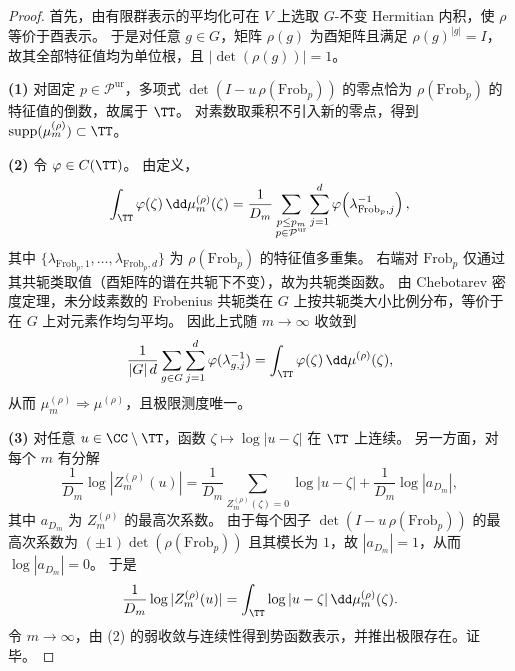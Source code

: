 \begin{proof}
首先，由有限群表示的平均化可在 \(V\) 上选取 \(G\)-不变 Hermitian 内积，使 \(\rho\) 等价于酉表示。
于是对任意 \(g\in G\)，矩阵 \(\rho(g)\) 为酉矩阵且满足 \(\rho(g)^{|g|}=I\)，故其全部特征值均为单位根，且 \(|\det(\rho(g))|=1\)。
\par
\textbf{(1)} 对固定 \(p\in\mathcal P^{\mathrm{ur}}\)，多项式 \(\det(I-u\,\rho(\mathrm{Frob}_p))\) 的零点恰为 \(\rho(\mathrm{Frob}_p)\) 的特征值的倒数，故属于 \(\TT\)。
对素数取乘积不引入新的零点，得到 \(\mathrm{supp}(\mu_m^{(\rho)})\subset \TT\)。
\par
\textbf{(2)} 令 \(\varphi\in C(\TT)\)。
由定义，
\[
\int_{\TT}\varphi(\zeta)\,\dd\mu_m^{(\rho)}(\zeta)
=\frac{1}{D_m}\sum_{\substack{p\le p_m\\ p\in\mathcal P^{\mathrm{ur}}}}
\sum_{j=1}^{d}\varphi\!\left(\lambda_{\mathrm{Frob}_p,j}^{-1}\right),
\]
其中 \(\{\lambda_{\mathrm{Frob}_p,1},\dots,\lambda_{\mathrm{Frob}_p,d}\}\) 为 \(\rho(\mathrm{Frob}_p)\) 的特征值多重集。
右端对 \(\mathrm{Frob}_p\) 仅通过其共轭类取值（酉矩阵的谱在共轭下不变），故为共轭类函数。
由 Chebotarev 密度定理，未分歧素数的 Frobenius 共轭类在 \(G\) 上按共轭类大小比例分布，等价于在 \(G\) 上对元素作均匀平均。
因此上式随 \(m\to\infty\) 收敛到
\[
\frac{1}{|G|\,d}\sum_{g\in G}\sum_{j=1}^{d}\varphi(\lambda_{g,j}^{-1})
=\int_{\TT}\varphi(\zeta)\,\dd\mu^{(\rho)}(\zeta),
\]
从而 \(\mu_m^{(\rho)}\Rightarrow \mu^{(\rho)}\)，且极限测度唯一。
\par
\textbf{(3)} 对任意 \(u\in\CC\setminus\TT\)，函数 \(\zeta\mapsto \log|u-\zeta|\) 在 \(\TT\) 上连续。
另一方面，对每个 \(m\) 有分解
\[
\frac{1}{D_m}\log|Z_m^{(\rho)}(u)|
=\frac{1}{D_m}\sum_{Z_m^{(\rho)}(\zeta)=0}\log|u-\zeta|
+\frac{1}{D_m}\log|a_{D_m}|,
\]
其中 \(a_{D_m}\) 为 \(Z_m^{(\rho)}\) 的最高次系数。
由于每个因子 \(\det(I-u\,\rho(\mathrm{Frob}_p))\) 的最高次系数为 \((\pm 1)\det(\rho(\mathrm{Frob}_p))\) 且其模长为 \(1\)，故 \(|a_{D_m}|=1\)，从而 \(\log|a_{D_m}|=0\)。
于是
\[
\frac{1}{D_m}\log|Z_m^{(\rho)}(u)|
=\int_{\TT}\log|u-\zeta|\,\dd\mu_m^{(\rho)}(\zeta).
\]
令 \(m\to\infty\)，由 (2) 的弱收敛与连续性得到势函数表示，并推出极限存在。证毕。
\end{proof}

